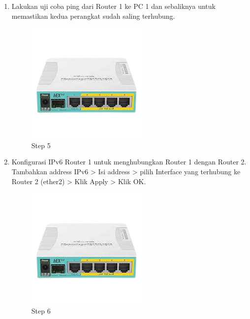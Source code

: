 \begin{enumerate}
	\item Lakukan uji coba ping dari Router 1 ke PC 1 dan sebaliknya untuk memastikan kedua perangkat
	sudah saling terhubung.	
	
	\begin{figure}[H]
		\centering
		\includegraphics[width=0.7\linewidth]{P1/img/contoh.png}
		\caption{Step 5}
		\label{fig:gambar1}
	\end{figure}

	\item Konfigurasi IPv6 Router 1 untuk menghubungkan Router 1 dengan Router 2. Tambahkan
	address IPv6 > Isi address > pilih Interface yang terhubung ke Router 2 (ether2) > Klik Apply > Klik OK.
	
	\begin{figure}[H]
		\centering
		\includegraphics[width=0.7\linewidth]{P1/img/contoh.png}
		\caption{Step 6}
		\label{fig:gambar1}
	\end{figure}


\end{enumerate}
